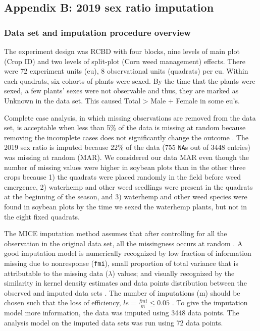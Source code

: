 \documentclass[utf8]{frontiersSCNS}
\begin{document}
\hypertarget{appendix-b-2019-sex-ratio-imputation}{%
\subsection*{Appendix B: 2019 sex ratio imputation}\label{appendix-b-2019-sex-ratio-imputation}}

\hypertarget{data-set-and-imputation-procedure-overview}{%
\subsubsection*{Data set and imputation procedure overview}\label{data-set-and-imputation-procedure-overview}}

The experiment design was RCBD with four blocks, nine levels of main plot (Crop ID) and two levels of split-plot (Corn weed management) effects. There were 72 experiment units (eu), 8 observational units (quadrats) per eu. Within each quadrats, six cohorts of plants were sexed. By the time that the plants were sexed, a few plants' sexes were not observable and thus, they are marked as Unknown in the data set. This caused Total \textgreater{} Male + Female in some eu's.

Complete case analysis, in which missing observations are removed from the data set, is acceptable when less than 5\% of the data is missing at random because removing the incomplete cases does not significantly change the outcome \citep{azurMultipleImputationChained2011}. The 2019 sex ratio is imputed because 22\% of the data (755 \texttt{NA}s out of 3448 entries) was missing at random (MAR). We considered our data MAR even though the number of missing values were higher in soybean plots than in the other three crops because 1) the quadrats were placed randomly in the field before weed emergence, 2) waterhemp and other weed seedlings were present in the quadrats at the beginning of the season, and 3) waterhemp and other weed species were found in soybean plots by the time we sexed the waterhemp plants, but not in the eight fixed quadrats.

The MICE imputation method assumes that after controlling for all the observation in the original data set, all the missingness occurs at random \citep{vanbuurenMiceMultivariateImputation2011}. A good imputation model is numerically recognized by low fraction of information missing due to nonresponse (\texttt{fmi}), small proportion of total variance that is attributable to the missing data (\(\lambda\)) values; and visually recognized by the similarity in kernel density estimates and data points distribution between the observed and imputed data sets \citep{vanbuurenMiceMultivariateImputation2011}. The number of imputations (m) should be chosen such that the loss of efficiency, \(le = \frac{fmi}{m} \leq 0.05\) \citep{whiteMultipleImputationUsing2011}. To give the imputation model more information, the data was imputed using 3448 data points. The analysis model on the imputed data sets was run using 72 data points.
\end{document}
